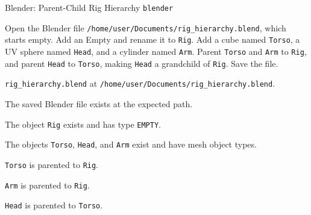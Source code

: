 \begin{taskexample}{Blender: Parent-Child Rig Hierarchy}
 \texttt{blender}

 Open the Blender file
\texttt{/home/user/Documents/rig\_hierarchy.blend}, which starts empty. Add an
Empty and rename it to \texttt{Rig}. Add a cube named \texttt{Torso}, a UV
sphere named \texttt{Head}, and a cylinder named \texttt{Arm}. Parent
\texttt{Torso} and \texttt{Arm} to \texttt{Rig}, and parent \texttt{Head} to
\texttt{Torso}, making \texttt{Head} a grandchild of \texttt{Rig}. Save the
file.

\texttt{rig\_hierarchy.blend} at
\texttt{/home/user/Documents/rig\_hierarchy.blend}.

\begin{compactitem}
    \item The saved Blender file exists at the expected path.
    \item The object \texttt{Rig} exists and has type \texttt{EMPTY}.
    \item The objects \texttt{Torso}, \texttt{Head}, and \texttt{Arm} exist and
    have mesh object types.
    \item \texttt{Torso} is parented to \texttt{Rig}.
    \item \texttt{Arm} is parented to \texttt{Rig}.
    \item \texttt{Head} is parented to \texttt{Torso}.
\end{compactitem}
\end{taskexample}